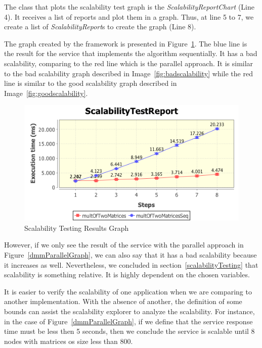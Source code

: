 The class that plots the scalability test graph is the \emph{ScalabilityReportChart} (Line 4). It receives a list of reports and plot them in a graph. Thus, at line 5 to 7, we create a list of \emph{ScalabilityReport}s to create the graph (Line 8).

The graph created by the framework is presented in Figure~\ref{dmmGraph}. The blue line is the result for the service that implements the algorithm sequentially. It has a bad scalability, comparing to the red line which is the parallel approach. It is similar to the bad scalability graph described in Image~\ref{fig:badscalability} while the red line is similar to the good scalability graph described in Image~\ref{fig:goodscalability}.

\begin{figure}[htbp]
\begin{center}
	\includegraphics[scale=0.8]{images/twoTestsReportLinear8}
\caption{Scalability Testing Results Graph}
\label{dmmGraph}
\end{center}
\end{figure}

However, if we only see the result of the service with the parallel approach in Figure~\ref{dmmParallelGraph}, we can also say that it has a bad scalability because it increases as well. Nevertheless, we concluded in section~\ref{scalabilityTesting} that scalability is something relative. It is highly dependent on the chosen variables. 

It is easier to verify the scalability of one application when we are comparing to another implementation. With the absence of another, the definition of some bounds can assist the scalability explorer to analyze the scalability. For instance, in the case of Figure~\ref{dmmParallelGraph}, if we define that the service response time must be less then 5 seconds, then we conclude the service is scalable until 8 nodes with matrices os size less than 800. 

